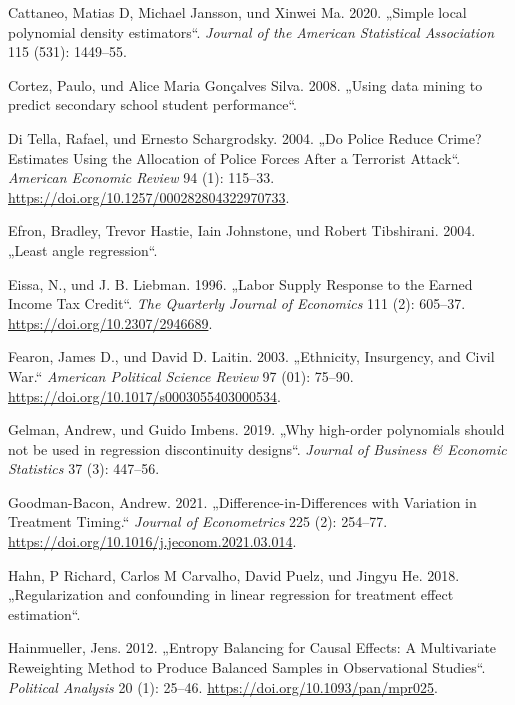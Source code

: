 \documentclass[
  a4paper,
  DIV=11,
  oneside]{scrreprt}
\newlength{\cslhangindent}
\newenvironment{CSLReferences}[2] %
 {\begin{list}{}{%
  \setlength{\itemindent}{0pt}
  \setlength{\leftmargin}{0pt}
  \setlength{\parsep}{0pt}
  \ifodd #1
   \setlength{\leftmargin}{\cslhangindent}
   \setlength{\itemindent}{-1\cslhangindent}
  \fi
  \setlength{\itemsep}{#2\baselineskip}}}
 {\end{list}}
\begin{document}
\begin{CSLReferences}{1}{0}
Cattaneo, Matias D, Michael Jansson, und Xinwei Ma. 2020. {„Simple local
polynomial density estimators``}. \emph{Journal of the American
Statistical Association} 115 (531): 1449--55.

Cortez, Paulo, und Alice Maria Gonçalves Silva. 2008. {„Using data
mining to predict secondary school student performance``}.

Di Tella, Rafael, und Ernesto Schargrodsky. 2004. {„Do Police Reduce
Crime? Estimates Using the Allocation of Police Forces After a Terrorist
Attack``}. \emph{American Economic Review} 94 (1): 115--33.
\url{https://doi.org/10.1257/000282804322970733}.

Efron, Bradley, Trevor Hastie, Iain Johnstone, und Robert Tibshirani.
2004. {„Least angle regression``}.

Eissa, N., und J. B. Liebman. 1996. {„Labor Supply Response to the
Earned Income Tax Credit``}. \emph{The Quarterly Journal of Economics}
111 (2): 605--37. \url{https://doi.org/10.2307/2946689}.

Fearon, James D., und David D. Laitin. 2003. {„Ethnicity, Insurgency,
and Civil War.``} \emph{American Political Science Review} 97 (01):
75--90. \url{https://doi.org/10.1017/s0003055403000534}.

Gelman, Andrew, und Guido Imbens. 2019. {„Why high-order polynomials
should not be used in regression discontinuity designs``}. \emph{Journal
of Business \& Economic Statistics} 37 (3): 447--56.

Goodman-Bacon, Andrew. 2021. {„Difference-in-Differences with Variation
in Treatment Timing.``} \emph{Journal of Econometrics} 225 (2): 254--77.
\url{https://doi.org/10.1016/j.jeconom.2021.03.014}.

Hahn, P Richard, Carlos M Carvalho, David Puelz, und Jingyu He. 2018.
{„Regularization and confounding in linear regression for treatment
effect estimation``}.

Hainmueller, Jens. 2012. {„Entropy Balancing for Causal Effects: A
Multivariate Reweighting Method to Produce Balanced Samples in
Observational Studies``}. \emph{Political Analysis} 20 (1): 25--46.
\url{https://doi.org/10.1093/pan/mpr025}.


\end{CSLReferences}
\end{document}
